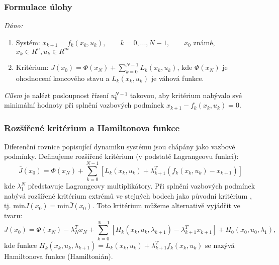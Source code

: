 \subsubsection*{Formulace úlohy}
\textit{Dáno:}
\begin{enumerate}
\item Systém: $ x_{k+1} = f_k(x_k, u_k), \qquad k=0,...,N-1, \qquad x_0 $ známé, $ x_k \in R^n, u_k \in R^m $
\item Kritérium: $ J(x_0) = \Phi(x_N) + \displaystyle{\sum_{k=0}^{N-1}}L_k(x_k,u_k) $, kde $ \Phi(x_N) $ je ohodnocení koncového stavu a $ L_k(x_k, u_k) $ je váhová funkce.
\end{enumerate}
\textit{Cílem} je nalézt posloupnost řízení $ u_0^{N-1} $ takovou, aby kritérium nabývalo své minimální hodnoty při splnění vazbových podmínek $ x_{k+1} - f_k(x_k, u_k) = 0 $.

\subsubsection*{Rozšířené kritérium a Hamiltonova funkce}
Diferenční rovnice popisující dynamiku systému jsou chápány jako vazbové podmínky. Definujeme rozšířené kritérium (v podstatě Lagrangeovu funkci):
\begin{equation}
\bar{J}(x_0) = \Phi(x_N) + \displaystyle{\sum_{k=0}^{N-1}}\left[ L_k(x_k,u_k) + \lambda_{k+1}^T(f_k(x_k,u_k)-x_{k+1}) \right]
\end{equation}
kde $ \lambda_1^N $ představuje Lagrangeovy multiplikátory. Při splnění vazbových podmínek nabývá rozšířené kritérium extrémů ve stejných bodech jako původní kritérium , tj. $ \mathrm{min} J(x_0) = \mathrm{min} \bar{J}(x_0) $. Toto kritérium můžeme alternativě vyjádřit ve tvaru:
\begin{equation}
\bar{J}(x_0) = \Phi(x_N) - \lambda_N^T x_N + \displaystyle{\sum_{k=0}^{N-1}}\left[ H_k(x_k,u_k,\lambda_{k+1}) - \lambda_{k+1}^T x_{k+1} \right] + H_0(x_0,u_0,\lambda_1),
\end{equation}
kde funkce $ H_k(x_k,u_k,\lambda_{k+1}) = L_k(x_k,u_k) + \lambda_{k+1}^T f_k(x_k,u_k) $ se nazývá Hamiltonova funkce (Hamiltonián).

